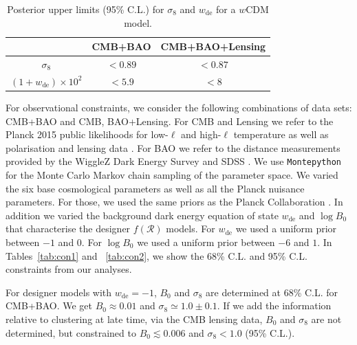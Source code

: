 \documentclass[nofootinbib,a4paper,aps,prd,10pt,superscriptaddress,reprint,showkeys,showpacs]{revtex4-1}
\newcommand{\qsubrm}[2]{{#1}_{\scriptscriptstyle{\textrm{#2}}}}
\begin{document}
\begin{table}[!th]
 \begin{center}
  \renewcommand*{\arraystretch}{1.2}
  \caption{\label{tab:con4} Posterior upper limits (95\% C.L.) for $\qsubrm{\sigma}{8}$ and $\qsubrm{w}{de}$ for a 
  $w$CDM model.}
  \begin{ruledtabular}
   \begin{tabular}{ccc}
    & CMB+BAO & CMB+BAO+Lensing \\
    \hline
    $\qsubrm{\sigma}{8}$     & $<0.89$ & $<0.87$\\
    
    $(1+\qsubrm{w}{de})\times10^2$         & $<5.9$ & $<8$ \\
   \end{tabular}
  \end{ruledtabular}
 \end{center}
\end{table}

For observational constraints, we consider the following combinations of data sets: CMB+BAO and CMB, BAO+Lensing. 
For CMB and Lensing we refer to the Planck 2015 public likelihoods for low-$\ell$ and high-$\ell$ temperature as 
well as polarisation and lensing data \citep{Planck2016_XIII}. 
For BAO we refer to the distance measurements provided by the WiggleZ Dark Energy Survey \citep{Kazin2014} and SDSS 
\citep{Ross2015}. We use \verb|Montepython| \citep{Audren2013} for the Monte Carlo Markov chain sampling of the 
parameter space. We varied the six base cosmological parameters as well as all the Planck nuisance parameters. For 
those, we used the same priors as the Planck Collaboration \citep{Planck2016_XIII}. In addition we varied the 
background dark energy equation of state $\qsubrm{w}{de}$ and $\log{\qsubrm{B}{0}}$ that characterise the designer 
$f(\mathcal{R})$ models. For $\qsubrm{w}{de}$ we used a uniform prior between $-1$ and $0$. For 
$\log{\qsubrm{B}{0}}$ we used a uniform prior between $-6$ and $1$. In Tables~\ref{tab:con1} and ~\ref{tab:con2}, we 
show the 68\% C.L. and 95\% C.L. constraints from our analyses.

For designer models with $\qsubrm{w}{de}=-1$, $\qsubrm{B}{0}$ and $\qsubrm{\sigma}{8}$ are determined at 68\% C.L. for 
CMB+BAO. We get $\qsubrm{B}{0}\approx0.01$ and $\qsubrm{\sigma}{8}\simeq 1.0\pm0.1$. If we add the information relative 
to clustering at late time, via the CMB lensing data, $\qsubrm{B}{0}$ and $\qsubrm{\sigma}{8}$ are not determined, but  
constrained to $\qsubrm{B}{0}\lesssim 0.006$ and $\qsubrm{\sigma}{8} < 1.0$ (95\% C.L.).
\end{document}
